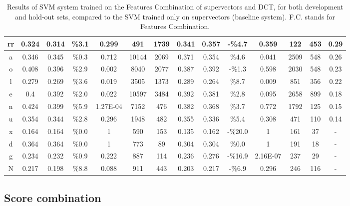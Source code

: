 \begin{table}[H]
{\begin{tabular}{|c| |c|c|c|c|c|c| |c|c|c|c|c|c| |c|}
rr & 0.324 & 0.314 & \%3.1 & 0.299 & 491 & 1739 & 0.341 & 0.357 & -\%4.7 & 0.359 & 122 & 453 & 0.29 \\ \hline
a & 0.346 & 0.345 & \%0.3 & 0.712 & 10144 & 2069 & 0.371 & 0.354 & \%4.6 & 0.041 & 2509 & 548 & 0.26 \\ \hline
\rowcolor{lightgray} o & 0.408 & 0.396 & \%2.9 & 0.002 & 8040 & 2077 & 0.387 & 0.392 & -\%1.3 & 0.598 & 2030 & 548 & 0.23 \\ \hline
\rowcolor{lightgray} l & 0.279 & 0.269 & \%3.6 & 0.019 & 3505 & 1373 & 0.289 & 0.264 & \%8.7 & 0.009 & 851 & 356 & 0.22 \\ \hline
\rowcolor{lightgray} e & 0.4 & 0.392 & \%2.0 & 0.022 & 10597 & 3484 & 0.392 & 0.381 & \%2.8 & 0.095 & 2658 & 899 & 0.18 \\ \hline
\rowcolor{lightgray} n & 0.424 & 0.399 & \%5.9 & 1.27E-04 & 7152 & 476 & 0.382 & 0.368 & \%3.7 & 0.772 & 1792 & 125 & 0.15 \\ \hline
u & 0.354 & 0.344 & \%2.8 & 0.296 & 1948 & 482 & 0.355 & 0.336 & \%5.4 & 0.308 & 471 & 110 & 0.14 \\ \hline
x & 0.164 & 0.164 & \%0.0 & 1 & 590 & 153 & 0.135 & 0.162 & -\%20.0 & 1 & 161 & 37 & - \\ \hline
d & 0.364 & 0.364 & \%0.0 & 1 & 773 & 89 & 0.304 & 0.304 & \%0.0 & 1 & 191 & 18 & - \\ \hline
g & 0.234 & 0.232 & \%0.9 & 0.222 & 887 & 114 & 0.236 & 0.276 & -\%16.9 & 2.16E-07 & 237 & 29 & - \\ \hline
N & 0.217 & 0.198 & \%8.8 & 0.088 & 911 & 443 & 0.203 & 0.217 & -\%6.9 & 0.296 & 246 & 116 & - \\ \hline

\end{tabular}

}
\caption{Results of SVM system trained on the Features Combination of supervectors and DCT,
for both development and hold-out sets,
compared to the SVM trained only on supervectors (baseline system). F.C. stands for
Features Combination.}
\label{tab:featuresCombinationAppendixTable}
\end{table}



\subsection{Score combination}

